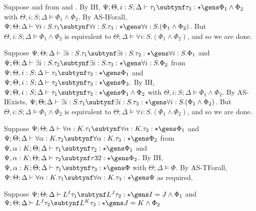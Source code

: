 \iffalse

  \item[(AS-IForall)] Suppose  and
   from  and . By IH, $\Psi ; \Theta, i : S ; \Delta \vdash \tau_1 \subtynf \tau_3 : \star \gens \Phi_1 \wedge \Phi_2$ with $\Theta, i: S ; \Delta \vDash \Phi_1 \wedge \Phi_2$. By AS-IForall, $\Psi ; \Theta ; \Delta \vdash \forall i : S. \tau_1 \subtynf \forall i : S.\tau_3 : \star \gens \forall i : S.(\Phi_1 \wedge \Phi_2)$. But $\Theta, i : S ; \Delta \vDash \Phi_1 \wedge \Phi_2$ is equivalent to $\Theta ; \Delta \vDash \forall i : S. (\Phi_1 \wedge \Phi_2)$, and so we are done.
  \item[(AS-IExists)]  Suppose $\Psi ; \Theta ; \Delta \vdash \exists i : S. \tau_1 \subtynf \exists i : S. \tau_2 : \star \gens \forall i : S. \Phi_1$ and
  $\Psi ; \Theta ; \Delta \vdash \exists i : S. \tau_2 \subtynf \exists i : S. \tau_3 : \star \gens \forall i : S. \Phi_2$ from $\Psi ; \Theta, i : S ; \Delta \vdash \tau_1 \subtynf \tau_2 : \star \gens \Phi_1$ and $\Psi ; \Theta, i : S ; \Delta \vdash \tau_2 \subtynf \tau_3 : \star \gens \Phi_3$. By IH, $\Psi ; \Theta, i : S ; \Delta \vdash \tau_1 \subtynf \tau_3 : \star \gens \Phi_1 \wedge \Phi_2$ with $\Theta, i: S ; \Delta \vDash \Phi_1 \wedge \Phi_2$. By AS-IExists, $\Psi ; \Theta ; \Delta \vdash \exists i : S. \tau_1 \subtynf \exists i : S.\tau_3 : \star \gens \forall i : S.(\Phi_1 \wedge \Phi_2)$. But $\Theta, i : S ; \Delta \vDash \Phi_1 \wedge \Phi_2$ is equivalent to $\Theta ; \Delta \vDash \forall i : S. (\Phi_1 \wedge \Phi_2)$, and so we are done.
  \item[(AS-TForall)] Suppose $\Psi ; \Theta ; \Delta \vdash \forall \alpha : K. \tau_1 \subtynf \forall \alpha : K. \tau_2 : \star \gens \Phi_1$ and
  $\Psi ; \Theta ; \Delta \vdash \forall \alpha : K. \tau_2 \subtynf \forall \alpha : K. \tau_3 : \star \gens \Phi_2$ from
  $\Psi, \alpha : K ; \Theta ; \Delta \vdash \tau_1 \subtynf \tau_2 : \star \gens \Phi_1$ and
  $\Psi, \alpha : K ; \Theta ; \Delta \vdash \tau_2 \subtynf \tau32 : \star \gens \Phi_2$.
  By IH, $\Psi, \alpha : K ; \Theta ; \Delta \vdash \tau_1 \subtynf \tau_3 : \star \gens \Phi$ with $\Theta ; \Delta \vDash \Phi$. By AS-TForall,
  $\Psi ; \Theta ; \Delta \vdash \forall \alpha : K. \tau_1 \subtynf \forall \alpha : K. \tau_3 : \star \gens \Phi$ as required.
  \item[(AS-List)] Suppose $\Psi ; \Theta ; \Delta \vdash L^I \tau_1 \subtynf L^J \tau_2 : \star \gens I = J \wedge \Phi_1$ and
  $\Psi ; \Theta ; \Delta \vdash L^J \tau_2 \subtynf L^K \tau_3 : \star \gens J = K \wedge \Phi_2$
